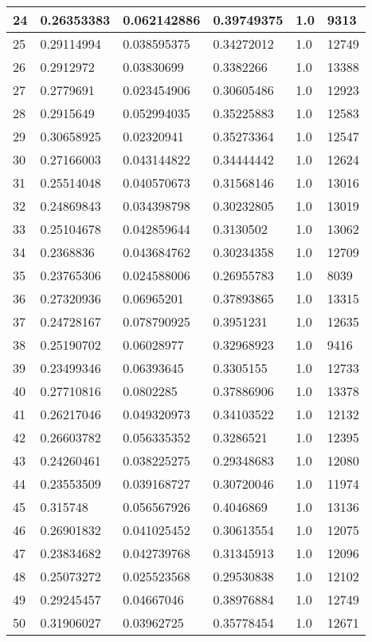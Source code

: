 \begin{longtable}{|l|l|l|l|l|l|}
24 & 0.26353383 & 0.062142886 & 0.39749375 & 1.0 & 9313 \\ \hline 
25 & 0.29114994 & 0.038595375 & 0.34272012 & 1.0 & 12749 \\ \hline 
26 & 0.2912972 & 0.03830699 & 0.3382266 & 1.0 & 13388 \\ \hline 
27 & 0.2779691 & 0.023454906 & 0.30605486 & 1.0 & 12923 \\ \hline 
28 & 0.2915649 & 0.052994035 & 0.35225883 & 1.0 & 12583 \\ \hline 
29 & 0.30658925 & 0.02320941 & 0.35273364 & 1.0 & 12547 \\ \hline 
30 & 0.27166003 & 0.043144822 & 0.34444442 & 1.0 & 12624 \\ \hline 
31 & 0.25514048 & 0.040570673 & 0.31568146 & 1.0 & 13016 \\ \hline 
32 & 0.24869843 & 0.034398798 & 0.30232805 & 1.0 & 13019 \\ \hline 
33 & 0.25104678 & 0.042859644 & 0.3130502 & 1.0 & 13062 \\ \hline 
34 & 0.2368836 & 0.043684762 & 0.30234358 & 1.0 & 12709 \\ \hline 
35 & 0.23765306 & 0.024588006 & 0.26955783 & 1.0 & 8039 \\ \hline 
36 & 0.27320936 & 0.06965201 & 0.37893865 & 1.0 & 13315 \\ \hline 
37 & 0.24728167 & 0.078790925 & 0.3951231 & 1.0 & 12635 \\ \hline 
38 & 0.25190702 & 0.06028977 & 0.32968923 & 1.0 & 9416 \\ \hline 
39 & 0.23499346 & 0.06393645 & 0.3305155 & 1.0 & 12733 \\ \hline 
40 & 0.27710816 & 0.0802285 & 0.37886906 & 1.0 & 13378 \\ \hline 
41 & 0.26217046 & 0.049320973 & 0.34103522 & 1.0 & 12132 \\ \hline 
42 & 0.26603782 & 0.056335352 & 0.3286521 & 1.0 & 12395 \\ \hline 
43 & 0.24260461 & 0.038225275 & 0.29348683 & 1.0 & 12080 \\ \hline 
44 & 0.23553509 & 0.039168727 & 0.30720046 & 1.0 & 11974 \\ \hline 
45 & 0.315748 & 0.056567926 & 0.4046869 & 1.0 & 13136 \\ \hline 
46 & 0.26901832 & 0.041025452 & 0.30613554 & 1.0 & 12075 \\ \hline 
47 & 0.23834682 & 0.042739768 & 0.31345913 & 1.0 & 12096 \\ \hline 
48 & 0.25073272 & 0.025523568 & 0.29530838 & 1.0 & 12102 \\ \hline 
49 & 0.29245457 & 0.04667046 & 0.38976884 & 1.0 & 12749 \\ \hline 
50 & 0.31906027 & 0.03962725 & 0.35778454 & 1.0 & 12671 \\ \hline 
\end{longtable}